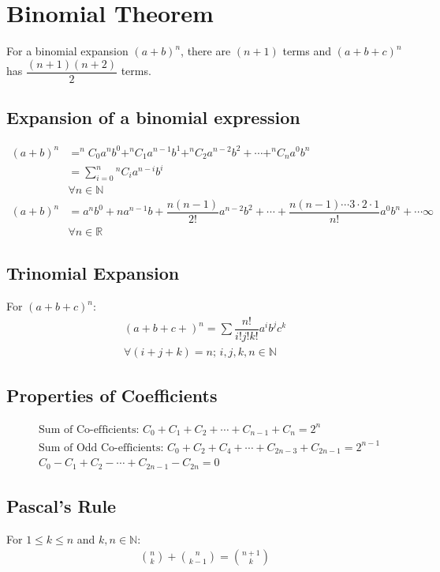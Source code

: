 \documentclass[../main.tex]{subfiles}
\begin{document}
\chapter{Binomial Theorem}
\begin{strip}
	For a binomial expansion $(a+b)^n$, there are $(n+1)$ terms and $(a+b+c)^n$ has $\dfrac{(n+1)(n+2)}{2}$ terms.

		\section{Expansion of a binomial expression}
			\begin{align}
				(a+b)^n & = ^nC_0 a^n b^0 + ^nC_1 a^{n-1} b^1 + ^nC_2 a^{n-2} b^2 + \cdots + ^nC_n a^0 b^n \nonumber \\
				& = \sum_{i=0}^{n} {^nC_{i}} a^{n-i} b^i \nonumber \\
				& \forall n \in \mathbb{N}\\				
				(a+b)^n & = a^n b^0 + na^{n-1} b + \dfrac{n(n-1)}{2!} a^{n-2} b^2  + \cdots + \dfrac{n(n-1) \cdots 3 \cdot 2 \cdot 1}{n!} a^0 b^n + \cdots \infty \nonumber\\
				&\forall n \in \mathbb{R}
		\end{align}
	
	\section{Trinomial Expansion}
	For $(a+b+c)^n$:
	\begin{align}
		(a+b+c+)^n = \sum \dfrac{n!}{i! j! k!} a^i b^j c^k \nonumber\\
		\forall (i+j+k) = n \text{; } i,j,k,n \in \mathbb{N}
	\end{align}
	
	\section{Properties of Coefficients}
	\begin{align}
		&\text{Sum of Co-efficients: } C_0 + C_1 + C_2 + \cdots + C_{n-1} + C_n = 2^n\\
		&\text{Sum of Odd Co-efficients: } C_0 + C_2 + C_4 + \cdots + C_{2n-3} + C_{2n-1} = 2^{n-1}\\
		& C_0 - C_1 + C_2 - \cdots + C_{2n-1} - C_{2n} = 0
	\end{align}
\end{strip}
	
	\section{Pascal's Rule}
	For $1 \leq k \leq n$ and  $k,n \in \mathbb{N}$:
	\begin{align}
		{{n}\choose{k}} + {{n}\choose{k-1}} = {{n+1}\choose{k}} 
	\end{align}
\end{document}
